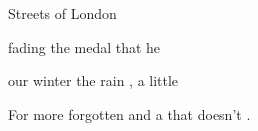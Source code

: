 \begin{SBSong}{Streets of London}
\begin{SBVerse}
	 fading  the medal  that he 
	
	 our winter  the rain , a little 
	
	For  more forgotten  and a  that doesn't .
  \end{SBVerse}
\end{SBSong}
